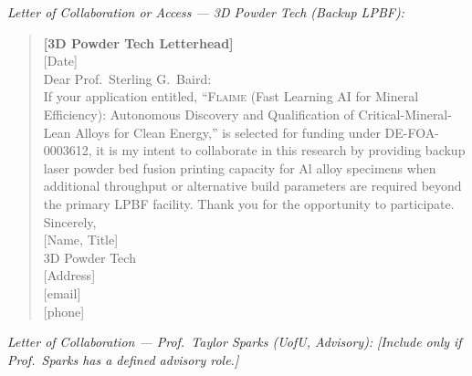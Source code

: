 \documentclass[11pt,letterpaper]{article}
\newcommand{\flaime}{\textsc{Flaime}}
\newcommand{\projecttitle}{\flaime{} (Fast Learning AI for Mineral
Efficiency): Autonomous Discovery and Qualification of
Critical-Mineral-Lean Alloys for Clean Energy}
\begin{document}




\clearpage
\textit{Letter of Collaboration or Access --- 3D Powder Tech (Backup LPBF):}

\begin{quote}\small
\textbf{{[}3D Powder Tech Letterhead{]}}\\[4pt]
{[}Date{]}\\[6pt]
Dear Prof.\ Sterling G.\ Baird:\\[4pt]
If your application entitled, ``\projecttitle{},'' is selected for
funding under DE-FOA-0003612, it is my intent to collaborate in this
research by providing backup laser powder bed fusion printing capacity for
Al alloy specimens when additional throughput or alternative build
parameters are required beyond the primary LPBF facility.
Thank you for the opportunity to participate.\\[12pt]
Sincerely,\\[4pt]
{[}Name, Title{]}\\
3D Powder Tech\\
{[}Address{]}\\
{[}email{]}\\
{[}phone{]}
\end{quote}



\clearpage
\textit{Letter of Collaboration --- Prof.\ Taylor Sparks (UofU, Advisory):}
\textit{{[}Include only if Prof.\ Sparks has a defined advisory role.{]}}
\end{document}
